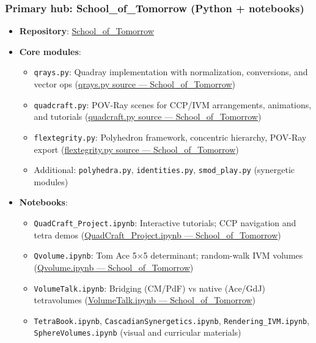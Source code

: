 \documentclass[
]{article}
\providecommand{\tightlist}{%
  \setlength{\itemsep}{0pt}\setlength{\parskip}{0pt}}
\begin{document}
\hypertarget{primary-hub-school_of_tomorrow-python-notebooks}{%
\subsubsection{Primary hub: School\_of\_Tomorrow (Python +
notebooks)}\label{primary-hub-school_of_tomorrow-python-notebooks}}

\begin{itemize}
\tightlist
\item
  \textbf{Repository}:
  \href{https://github.com/4dsolutions/School_of_Tomorrow}{School\_of\_Tomorrow}
\item
  \textbf{Core modules}:

  \begin{itemize}
  \tightlist
  \item
    \texttt{qrays.py}: Quadray implementation with normalization,
    conversions, and vector ops
    (\href{https://github.com/4dsolutions/School_of_Tomorrow/blob/master/qrays.py}{qrays.py
    source --- School\_of\_Tomorrow})
  \item
    \texttt{quadcraft.py}: POV-Ray scenes for CCP/IVM arrangements,
    animations, and tutorials
    (\href{https://github.com/4dsolutions/School_of_Tomorrow/blob/master/quadcraft.py}{quadcraft.py
    source --- School\_of\_Tomorrow})
  \item
    \texttt{flextegrity.py}: Polyhedron framework, concentric hierarchy,
    POV-Ray export
    (\href{https://github.com/4dsolutions/School_of_Tomorrow/blob/master/flextegrity.py}{flextegrity.py
    source --- School\_of\_Tomorrow})
  \item
    Additional: \texttt{polyhedra.py}, \texttt{identities.py},
    \texttt{smod\_play.py} (synergetic modules)
  \end{itemize}
\item
  \textbf{Notebooks}:

  \begin{itemize}
  \tightlist
  \item
    \texttt{QuadCraft\_Project.ipynb}: Interactive tutorials; CCP
    navigation and tetra demos
    (\href{https://github.com/4dsolutions/School_of_Tomorrow/blob/master/QuadCraft_Project.ipynb}{QuadCraft\_Project.ipynb
    --- School\_of\_Tomorrow})
  \item
    \texttt{Qvolume.ipynb}: Tom Ace 5×5 determinant; random-walk IVM
    volumes
    (\href{https://github.com/4dsolutions/School_of_Tomorrow/blob/master/Qvolume.ipynb}{Qvolume.ipynb
    --- School\_of\_Tomorrow})
  \item
    \texttt{VolumeTalk.ipynb}: Bridging (CM/PdF) vs native (Ace/GdJ)
    tetravolumes
    (\href{https://github.com/4dsolutions/School_of_Tomorrow/blob/master/VolumeTalk.ipynb}{VolumeTalk.ipynb
    --- School\_of\_Tomorrow})
  \item
    \texttt{TetraBook.ipynb}, \texttt{CascadianSynergetics.ipynb},
    \texttt{Rendering\_IVM.ipynb}, \texttt{SphereVolumes.ipynb} (visual
    and curricular materials)
  \end{itemize}
\end{itemize}
\end{document}
